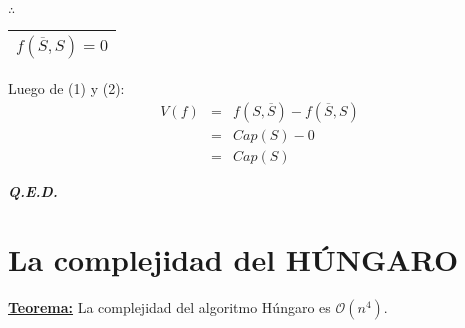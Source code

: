 \documentclass[12pt,a4paper]{report}
\newcommand{\QED}{\hfill \textit{\textbf{Q.E.D.}}}
\begin{document}
\begin{enumerate}[(1)]
							\vspace{3mm}
							\par $\therefore$ \begin{tabular}{|c|} \hline $ f(\overline{S}, S) = 0 $ \\\hline \end{tabular}
					\end{enumerate}

					\par Luego de (1) y (2):
					\begin{eqnarray}
						\nonumber V(f) &=& f(S, \overline{S}) - f(\overline{S}, S)\\
						\nonumber &=& Cap(S) - 0 \\
						\nonumber &=& Cap(S)
					\end{eqnarray}

		\QED

	\section{La complejidad del HÚNGARO}
		\textbf{\underline{Teorema:}} La complejidad del algoritmo Húngaro es $\mathcal{O}(n^{4})$.
\end{document}
